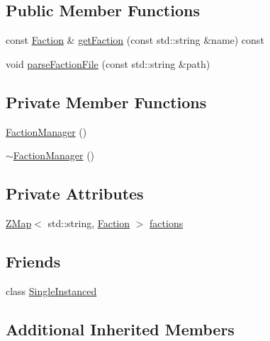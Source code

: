 \subsection*{Public Member Functions}
\begin{DoxyCompactItemize}
\item 
const \hyperlink{classZeta_1_1Faction}{Faction} \& \hyperlink{classZeta_1_1FactionManager_ab88cf03cc587ea857b2444f6defbb006}{get\+Faction} (const std\+::string \&name) const 
\item 
void \hyperlink{classZeta_1_1FactionManager_a7d6acaf2fedc9812db6aef238b0b63c3}{parse\+Faction\+File} (const std\+::string \&path)
\end{DoxyCompactItemize}
\subsection*{Private Member Functions}
\begin{DoxyCompactItemize}
\item 
\hyperlink{classZeta_1_1FactionManager_aa8678cc1f7917950bdb227fc5c9a8ba5}{Faction\+Manager} ()
\item 
\hyperlink{classZeta_1_1FactionManager_af00b1f83825cae8fc214e53cb7e7f394}{$\sim$\+Faction\+Manager} ()
\end{DoxyCompactItemize}
\subsection*{Private Attributes}
\begin{DoxyCompactItemize}
\item 
\hyperlink{namespaceZeta_a9af2e12c4e432d2a1725f19e5a648a04}{Z\+Map}$<$ std\+::string, \hyperlink{classZeta_1_1Faction}{Faction} $>$ \hyperlink{classZeta_1_1FactionManager_aac5322c29ef171ee50661c38767681f4}{factions}
\end{DoxyCompactItemize}
\subsection*{Friends}
\begin{DoxyCompactItemize}
\item 
class \hyperlink{classZeta_1_1FactionManager_a2fa95d69b32a77fffa4b730679a8b08c}{Single\+Instanced}
\end{DoxyCompactItemize}
\subsection*{Additional Inherited Members}


